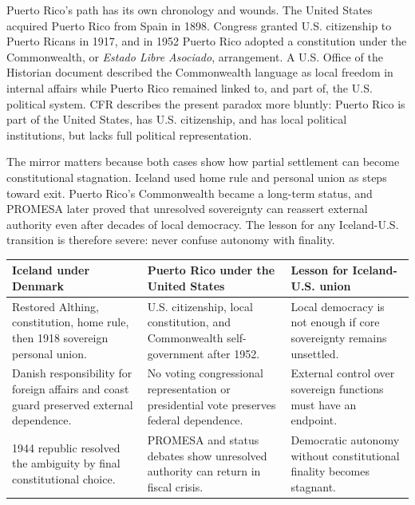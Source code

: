 \documentclass[11pt,a4paper]{article}
\begin{document}
Puerto Rico's path has its own chronology and wounds. The United States acquired Puerto Rico from Spain in 1898. Congress granted U.S. citizenship to Puerto Ricans in 1917, and in 1952 Puerto Rico adopted a constitution under the Commonwealth, or \textit{Estado Libre Asociado}, arrangement. A U.S. Office of the Historian document described the Commonwealth language as local freedom in internal affairs while Puerto Rico remained linked to, and part of, the U.S. political system.\cite{historianprcommonwealth} CFR describes the present paradox more bluntly: Puerto Rico is part of the United States, has U.S. citizenship, and has local political institutions, but lacks full political representation.\cite{cfrpuertorico}

The mirror matters because both cases show how partial settlement can become constitutional stagnation. Iceland used home rule and personal union as steps toward exit. Puerto Rico's Commonwealth became a long-term status, and PROMESA later proved that unresolved sovereignty can reassert external authority even after decades of local democracy. The lesson for any Iceland-U.S. transition is therefore severe: never confuse autonomy with finality.

\begin{center}
\small
\renewcommand{\arraystretch}{1.25}
\begin{tabular}{L{0.28\textwidth}L{0.28\textwidth}L{0.30\textwidth}}
\toprule
\textbf{Iceland under Denmark} & \textbf{Puerto Rico under the United States} & \textbf{Lesson for Iceland-U.S. union} \\
\midrule
Restored Althing, constitution, home rule, then 1918 sovereign personal union. & U.S. citizenship, local constitution, and Commonwealth self-government after 1952. & Local democracy is not enough if core sovereignty remains unsettled. \\
Danish responsibility for foreign affairs and coast guard preserved external dependence. & No voting congressional representation or presidential vote preserves federal dependence. & External control over sovereign functions must have an endpoint. \\
1944 republic resolved the ambiguity by final constitutional choice. & PROMESA and status debates show unresolved authority can return in fiscal crisis. & Democratic autonomy without constitutional finality becomes stagnant. \\
\bottomrule
\end{tabular}
\end{center}
\end{document}
